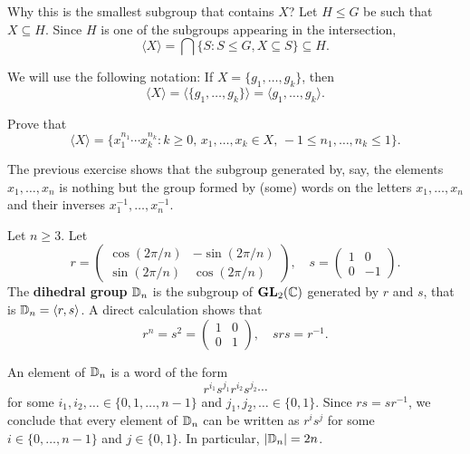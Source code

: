 Why this is the smallest subgroup that contains $X$? 
Let $H\leq G$ be such that 
$X\subseteq H$. Since $H$ is one of the subgroups appearing
in the intersection, 
\[
        \langle X\rangle=\bigcap\{S:S\leq G,X\subseteq S\}\subseteq H.        
\]

We will use the following notation:
If $X=\{g_1,\dots,g_k\}$, then 
\[
\langle
X\rangle=\langle\{g_1,\dots,g_k\}\rangle=\langle g_1,\dots,g_k\rangle.
\]

\begin{exercise}
\label{xca:generated}
Prove that 
\[
    \langle X\rangle=\{x_1^{n_1}\cdots x_k^{n_k}:k\geq0,\,x_1,\dots,x_k\in X,\,-1\leq n_1,\dots,n_k\leq 1\}.
\]
\end{exercise}

The previous exercise shows that
the subgroup generated by, say, the elements 
$x_1,\dots,x_n$ is nothing but the 
group formed by (some) words on the letters 
$x_1,\dots,x_n$ and their inverses 
$x_1^{-1},\dots,x_n^{-1}$. 

\begin{example}
Let $n\geq3$. Let 
\[
r=\begin{pmatrix}
\cos(2\pi/n) & -\sin(2\pi/n)\\
\sin(2\pi/n) & \cos(2\pi/n)
\end{pmatrix},
\quad
s=\begin{pmatrix}
        1 & 0\\
        0 & -1
\end{pmatrix}.
\]
The \textbf{dihedral group} $\mathbb{D}_n$ is the subgroup of
$\mathbf{GL}_2(\mathbb{C})$ generated by $r$ and $s$,
that is $\mathbb{D}_n=\langle r,s\rangle$. A direct calculation shows that 
\[
r^n=s^2=\begin{pmatrix}
        1&0\\
        0&1
\end{pmatrix},
\quad
srs=r^{-1}.
\]

An element of $\mathbb{D}_n$ is a word of the form 
\[
r^{i_1}s^{j_1}r^{i_2}s^{j_2}\cdots
\]
for some 
 $i_1,i_2,\dots\in\{0,1,\dots,n-1\}$ and 
$j_1,j_2,\dots\in\{0,1\}$. Since $rs=sr^{-1}$, we conclude that
every element of $\mathbb{D}_n$ can be written as $r^is^j$ 
for some $i\in\{0,\dots,n-1\}$ and $j\in\{0,1\}$. In particular, 
$|\mathbb{D}_n|=2n$.
\end{example}

